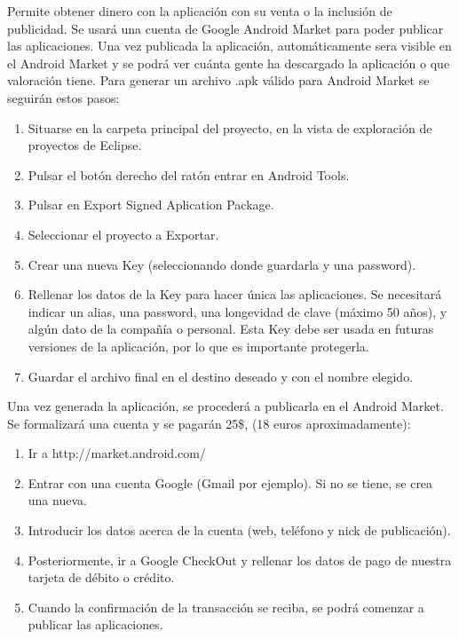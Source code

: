 \documentclass[12 pt, a4paper, twoside]{article}
\begin{document}
Permite obtener dinero con la aplicación con su venta o la inclusión de publicidad.
Se usará una cuenta de Google Android Market para poder publicar las aplicaciones.
Una vez publicada la aplicación, automáticamente sera visible en el
Android Market y se podrá ver cuánta gente ha descargado la aplicación o que
valoración tiene.
Para generar un archivo .apk válido para Android Market se seguirán estos
pasos:
\begin{enumerate}
\item Situarse en la carpeta principal del proyecto, en la vista de exploración de
proyectos de Eclipse.
\item Pulsar el botón derecho del ratón entrar en Android Tools.
\item Pulsar en Export Signed Aplication Package.
\item Seleccionar el proyecto a Exportar.
\item Crear una nueva Key (seleccionando donde guardarla y una password).
\item Rellenar los datos de la Key para hacer única las aplicaciones. Se necesitará
indicar un alias, una password, una longevidad de clave (máximo 50 años), y
algún dato de la compañía o personal. Esta Key debe ser usada en futuras
versiones de la aplicación, por lo que es importante protegerla.
\item Guardar el archivo final en el destino deseado y con el nombre elegido.
\end{enumerate}

Una vez generada la aplicación, se procederá a publicarla en el Android Market.
Se formalizará una cuenta y se pagarán 25\$, (18 euros aproximadamente):
\begin{enumerate}
\item Ir a http://market.android.com/
\item Entrar con una cuenta Google (Gmail por ejemplo). Si no se tiene, se crea
una nueva.
\item Introducir los datos acerca de la cuenta (web, teléfono y nick de publicación).
\item Posteriormente, ir a Google CheckOut y rellenar los datos de pago de nuestra
tarjeta de débito o crédito.
\item Cuando la confirmación de la transacción se reciba, se podrá comenzar a
publicar las aplicaciones.
\end{enumerate}
\end{document}
